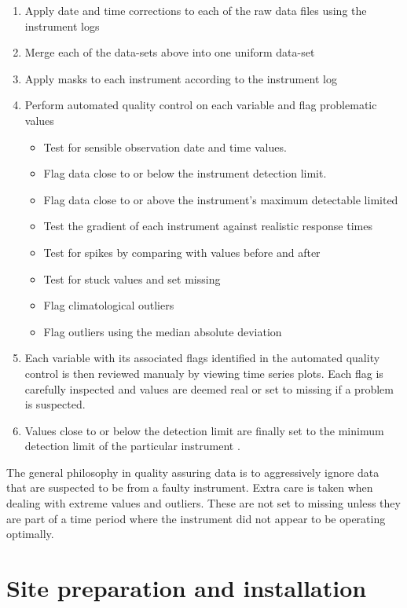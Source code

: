\documentclass{nwureport}
\begin{document}
\begin{enumerate}
\item Apply date and time corrections to each of the raw data files
  using the instrument logs
\item Merge each of the data-sets above into one uniform data-set
\item Apply masks to each instrument according to the instrument log
\item Perform automated quality control on each variable and flag problematic values
  \begin{itemize}
   \item Test for sensible observation date and time values.
   \item Flag data close to or below the instrument detection limit. 
   \item Flag data close to or above the instrument's maximum detectable limited
   \item Test the gradient of each instrument against realistic response times
   \item Test for spikes by comparing with values before and after
   \item Test for stuck values and set missing
   \item Flag climatological outliers
   \item Flag outliers using the median absolute deviation
  \end{itemize}
\item Each variable with its associated flags identified in the automated quality control is then reviewed manualy by viewing time series plots. Each flag is carefully inspected and values are deemed real or set to missing if a problem is suspected.
\item Values close to or below the detection limit are finally set to the minimum detection limit of the particular instrument \citep{Croghan2003}.
\end{enumerate}

The general philosophy in quality assuring data is to aggressively
ignore data that are suspected to be from a faulty instrument. Extra
care is taken when dealing with extreme values and outliers. These are
not set to missing unless they are part of a time period where the
instrument did not appear to be operating optimally.

\chapter{Site preparation and installation}
\end{document}
